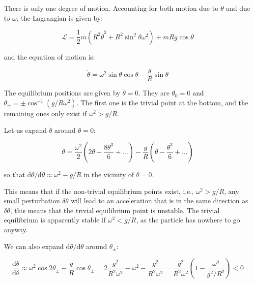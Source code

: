 \documentclass[12pt]{article}
\begin{document}

There is only one degree of motion. Accounting for both motion due to $\dot{\theta}$ and due to $\omega$, the Lagrangian is given by:

\begin{equation}
    \mathcal{L} = \frac{1}{2} m (R^{2} \dot{\theta}^{2} + R^{2} \sin^{2}{\theta} \omega^{2}) + mRg \cos{\theta}
\end{equation}

and the equation of motion is:

\begin{equation}
    \ddot{\theta} = \omega^{2} \sin{\theta} \cos{\theta} - \frac{g}{R} \sin{\theta}
\end{equation}

The equilibrium positions are given by $\ddot{\theta} = 0$. They are $\theta_{0} = 0$ and $\theta_{\pm} = \pm \cos^{-1}{(g/R \omega^{2})}$. The first one is the trivial point at the bottom, and the remaining ones only exist if $\omega^{2} > g/R$.

Let us expand $\ddot{\theta}$ around $\theta = 0$:

\begin{equation}
    \ddot{\theta} = \frac{\omega^{2}}{2} \left( 2\theta - \frac{8\theta^{3}}{6} + \dots \right) - \frac{g}{R} \left( \theta - \frac{\theta^{3}}{6} + \dots \right)
\end{equation}

so that $\mathrm{d}\ddot{\theta}/\mathrm{d}\theta \approx \omega^{2} - g/R$ in the vicinity of $\theta = 0$.

This means that if the non-trivial equilibrium points exist, i.e., $\omega^{2} > g/R$, any small perturbation $\delta \theta$ will lead to an acceleration that is in the same direction as $\delta \theta$, this means that the trivial equilibrium point is unstable. The trivial equilibrium is apparently stable if $\omega^{2} < g/R$, as the particle has nowhere to go anyway.

We can also expand $\mathrm{d}\ddot{\theta}/\mathrm{d}\theta$ around $\theta_{\pm}$:

\begin{equation}
    \frac{\mathrm{d}\ddot{\theta}}{\mathrm{d}\theta} \approx \omega^{2} \cos{2\theta_{\pm}} - \frac{g}{R} \cos{\theta_{\pm}} = 2 \frac{g^{2}}{R^{2}\omega^{2}} - \omega^{2} - \frac{g^{2}}{R^{2} \omega^{2}} = \frac{g^{2}}{R^{2}\omega^{2}} \left( 1 - \frac{\omega^{4}}{g^{2}/R^{2}} \right) < 0
\end{equation}
\end{document}
